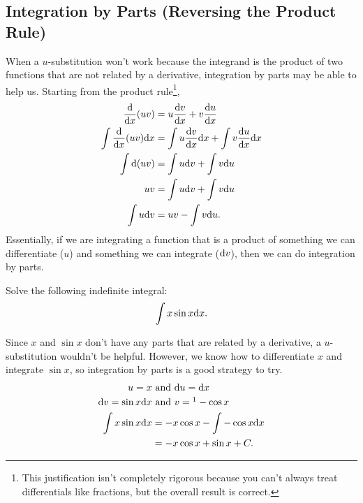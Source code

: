 \subsection{Integration by Parts (Reversing the Product Rule)}
When a $u$-substitution won't work because the integrand is the product of two functions that are not related by a derivative, integration by parts may be able to help us.
Starting from the product rule\footnote{This justification isn't completely rigorous because you can't always treat differentials like fractions, but the overall result is correct.},
\begin{align*}
	\frac{\mathrm{d} }{\mathrm{d} x}{(uv)} &= u\frac{\mathrm{d} v}{\mathrm{d} x} + v\frac{\mathrm{d} u}{\mathrm{d} x} \\
	\int{\frac{\mathrm{d} }{\mathrm{d} x}{(uv)}\mathrm{d} x} &= \int{u\frac{\mathrm{d} v}{\mathrm{d} x}\mathrm{d} x} + \int{v\frac{\mathrm{d} u}{\mathrm{d} x}\mathrm{d} x} \\
	\int{\mathrm{d} (uv)} &= \int{u\mathrm{d} v} + \int{v\mathrm{d} u} \\
	uv &= \int{u\mathrm{d} v} + \int{v\mathrm{d} u} \\
	\int{u\mathrm{d} v} &= uv - \int{v\mathrm{d} u}.
\end{align*}
\noindent
Essentially, if we are integrating a function that is a product of something we can differentiate ($u$) and something we can integrate ($\mathrm{d} v$), then we can do integration by parts.
\begin{example}
	Solve the following indefinite integral:
	\begin{equation*}
		\int{x\sin{x}\mathrm{d} x}.
	\end{equation*}
\end{example}
Since $x$ and $\sin{x}$ don't have any parts that are related by a derivative, a $u$-substitution wouldn't be helpful.
However, we know how to differentiate $x$ and integrate $\sin{x}$, so integration by parts is a good strategy to try.
\begin{align*}
	u = x &\text{ and } \d{u} = \d{x} \\
	\d{v} = \sin{x}\d{x} &\text{ and } v =\footnotemark -\cos{x} \\
	\int{x\sin{x}\d{x}} &= -x\cos{x} - \int{-\cos{x}\d{x}} \\
	&= -x\cos{x} + \sin{x} + C.
\end{align*}

